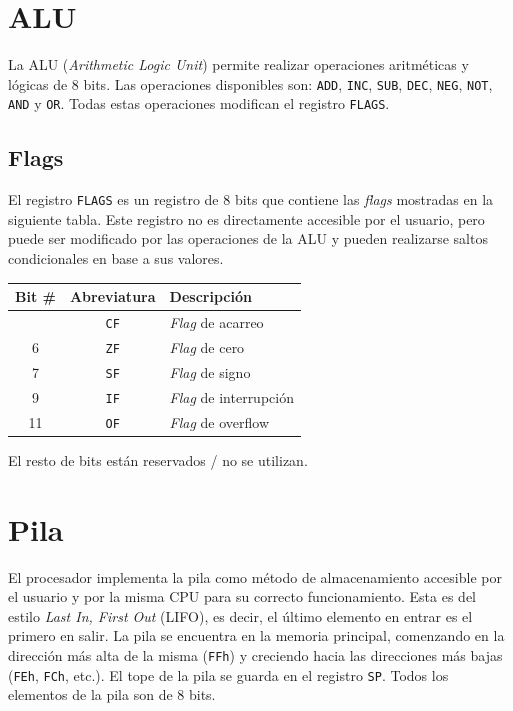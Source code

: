 \documentclass[12pt,oneside]{templates/unerthesis}
\begin{document}
\hypertarget{alu}{%
\section{ALU}\label{alu}}

La ALU (\emph{Arithmetic Logic Unit}) permite realizar operaciones aritméticas y lógicas de 8 bits. Las operaciones disponibles son: \texttt{ADD}, \texttt{INC}, \texttt{SUB}, \texttt{DEC}, \texttt{NEG}, \texttt{NOT}, \texttt{AND} y \texttt{OR}. Todas estas operaciones modifican el registro \texttt{FLAGS}.

\hypertarget{flags-1}{%
\subsection{Flags}\label{flags-1}}

El registro \texttt{FLAGS} es un registro de 8 bits que contiene las \emph{flags} mostradas en la siguiente tabla. Este registro no es directamente accesible por el usuario, pero puede ser modificado por las operaciones de la ALU y pueden realizarse saltos condicionales en base a sus valores.

\begin{longtable}[]{@{}ccl@{}}
\toprule\noalign{}
Bit \# & Abreviatura & Descripción \\
\midrule\noalign{}
\endhead
\bottomrule\noalign{}
\endlastfoot
0 & \texttt{CF} & \emph{Flag} de acarreo \\
6 & \texttt{ZF} & \emph{Flag} de cero \\
7 & \texttt{SF} & \emph{Flag} de signo \\
9 & \texttt{IF} & \emph{Flag} de interrupción \\
11 & \texttt{OF} & \emph{Flag} de overflow \\
\end{longtable}

El resto de bits están reservados / no se utilizan.

\hypertarget{pila}{%
\section{Pila}\label{pila}}

El procesador implementa la pila como método de almacenamiento accesible por el usuario y por la misma CPU para su correcto funcionamiento. Esta es del estilo \emph{Last In, First Out} (LIFO), es decir, el último elemento en entrar es el primero en salir. La pila se encuentra en la memoria principal, comenzando en la dirección más alta de la misma (\texttt{FFh}) y creciendo hacia las direcciones más bajas (\texttt{FEh}, \texttt{FCh}, etc.). El tope de la pila se guarda en el registro \texttt{SP}. Todos los elementos de la pila son de 8 bits.
\end{document}

